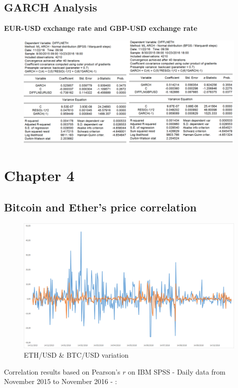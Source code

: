 \documentclass[11pt]{report}
\begin{document}
\subsection*{GARCH Analysis}
\textbf{EUR-USD exchange rate and GBP-USD exchange rate}
\begin{figure}[!h]
\includegraphics[scale=1.1]{Appendix/chap3/13}
\end{figure}
\clearpage

\section*{Chapter 4}
\subsection*{Bitcoin and Ether's price correlation}
\begin{figure}[!h]
\centering
\includegraphics[scale=0.5]{Chap5/Variation}\medbreak
\centering
\caption{ETH/USD \& BTC/USD variation}
\label{Variation}
\end{figure}

Correlation results based on Pearson's $r$ on IBM SPSS - Daily data from November 2015 to November 2016 - : \medbreak
\end{document}
